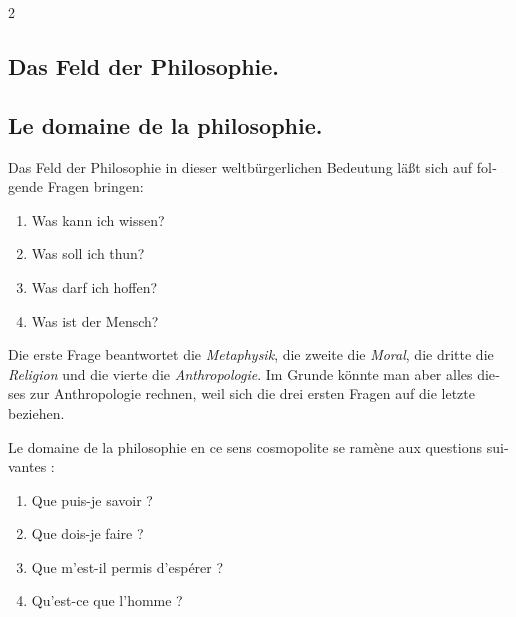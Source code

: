 \documentclass[a5paper,12pt,landscape]{article}
\newcommand\chunks[2]{%
\begin{leftcolumn*}\begin{otherlanguage}{german}%
{#1}%
\end{otherlanguage}\end{leftcolumn*}%
\begin{rightcolumn}\begin{otherlanguage}{french}%
{#2}%
\end{otherlanguage}\end{rightcolumn}%
}
\begin{document}
\thispagestyle{empty}
\setlength{\columnsep}{8mm}
\setlength{\columnseprule}{0.4pt}




\begin{paracol}{2}
  \chunks{\subsection*{Das Feld der Philosophie.}}
         {\subsection*{Le domaine de la philosophie.}}
  \chunks{Das Feld der Philosophie in dieser weltbürgerlichen Bedeutung läßt sich auf folgende Fragen bringen: 	  	  	 

\begin{enumerate}
  \item Was kann ich wissen?
  \item Was soll ich thun?
  \item Was darf ich hoffen?
  \item Was ist der Mensch?
\end{enumerate}

Die erste Frage beantwortet die \emph{Metaphysik}, die zweite die \emph{Moral}, die dritte die \emph{Religion} und die vierte die \emph{Anthropologie}. Im Grunde könnte man aber alles dieses zur Anthropologie rechnen, weil sich die drei ersten Fragen auf die letzte beziehen.}
         {Le domaine de la philosophie en ce sens cosmopolite se ramène aux questions suivantes :

\begin{enumerate}
  \item Que puis-je savoir ?
  \item Que dois-je faire ?
  \item Que m'est-il permis d'espérer ?
  \item Qu'est-ce que l'homme ?
\end{enumerate}

}
\end{paracol}
\end{document}
